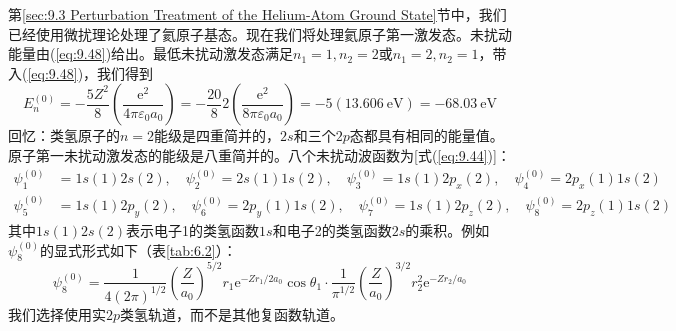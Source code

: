     第\ref{sec:9.3 Perturbation Treatment of the Helium-Atom Ground State}节中，我们已经使用微扰理论处理了氦原子基态。现在我们将处理氦原子第一激发态。未扰动能量由(\ref{eq:9.48})给出。最低未扰动激发态满足$n_1 = 1, n_2 = 2$或$n_1 = 2, n_2 = 1$，带入(\ref{eq:9.48})，我们得到
    \begin{equation}
        E_n^{\left(0\right)} = -\frac{5Z^2}{8}\left(\frac{\mathrm{e}^2}{4\pi\varepsilon_0a_0}\right) = -\frac{20}{8}2\left(\frac{\mathrm{e}^2}{8\pi\varepsilon_0a_0}\right) = -5\left(13.606 \:\mathrm{eV}\right) = -68.03 \:\mathrm{eV}
        \label{eq:9.92}
    \end{equation}
    回忆：类氢原子的$n=2$能级是四重简并的，$2s$和三个$2p$态都具有相同的能量值。原子第一未扰动激发态的能级是八重简并的。八个未扰动波函数为[式(\ref{eq:9.44})]：
    \begin{equation}
        \begin{aligned}
            \psi_1^{\left(0\right)} &= 1s\left(1\right)2s\left(2\right), \quad \psi_2^{\left(0\right)} = 2s\left(1\right)1s\left(2\right), \quad \psi_3^{\left(0\right)} = 1s\left(1\right)2p_x\left(2\right), \quad \psi_4^{\left(0\right)} = 2p_x\left(1\right)1s\left(2\right) \\
            \psi_5^{\left(0\right)} &= 1s\left(1\right)2p_y\left(2\right), \quad \psi_6^{\left(0\right)} = 2p_y\left(1\right)1s\left(2\right), \quad \psi_7^{\left(0\right)} = 1s\left(1\right)2p_z\left(2\right), \quad \psi_8^{\left(0\right)} = 2p_z\left(1\right)1s\left(2\right)
        \end{aligned}
        \label{eq:9.93}
    \end{equation}
    其中$1s\left(1\right)2s\left(2\right)$表示电子1的类氢函数$1s$和电子2的类氢函数$2s$的乘积。例如$\psi_8^{\left(0\right)}$的显式形式如下（表\ref{tab:6.2}）：
    \begin{equation*}
        \psi_8^{\left(0\right)} = \frac{1}{4\left(2\pi\right)^{1/2}}\left(\frac{Z}{a_0}\right)^{5/2}r_1\mathrm{e}^{-Zr_1/2a_0}\cos\theta_1 \cdot \frac{1}{\pi^{1/2}}\left(\frac{Z}{a_0}\right)^{3/2}r_2^2\mathrm{e}^{-Zr_2/a_0}
    \end{equation*}
    我们选择使用实$2p$类氢轨道，而不是其他复函数轨道。

